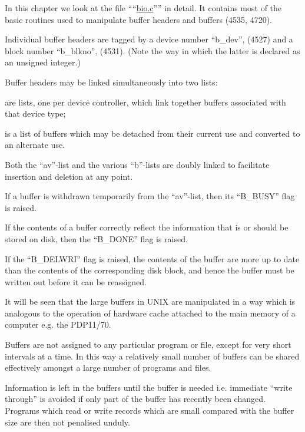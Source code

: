%
%

In this chapter we look at the file
````\href{./v6/dmr/bio.c}{bio.c}'''' in detail. It contains most of
the basic routines used to manipulate
buffer headers and buffers (4535,
4720).


Individual buffer headers are tagged by
a device number ``b\_dev'', (4527) and a
block number ``b\_blkno'', (4531). (Note
the way in which the latter is declared
as an unsigned integer.)

Buffer headers may be linked simultaneously into two lists:

\bd
\item[the ``b''-lists] are lists, one per
device controller, which link
together buffers associated with
that device type;

\item[the ``av''-list] is a list of buffers
which may be detached from their
current use and converted to an
alternate use.
\ed

Both the ``av''-list and the various
``b''-lists are doubly linked to facilitate insertion and deletion at any
point.


If a buffer is withdrawn temporarily
from the ``av''-list, then its ``B\_BUSY''
flag is raised.

If the contents of a buffer correctly
reflect the information that is or
should be stored on disk, then the
``B\_DONE'' flag is raised.

If the ``B\_DELWRI'' flag is raised, the
contents of the buffer are more up to
date than the contents of the
corresponding disk block, and hence the
buffer must be written out before it
can be reassigned.



It will be seen that the large buffers
in UNIX are manipulated in a way which
is analogous to the operation of
hardware cache attached to the main
memory of a computer e.g. the PDP11/70.

Buffers are not assigned to any particular program or file, except for very
short intervals at a time. In this way
a relatively small number of buffers
can be shared effectively amongst a
large number of programs and files.

Information is left in the buffers
until the buffer is needed i.e. immediate ``write through'' is avoided if only
part of the buffer has recently been
changed. Programs which read or write
records which are small compared with
the buffer size are then not penalised
unduly.

